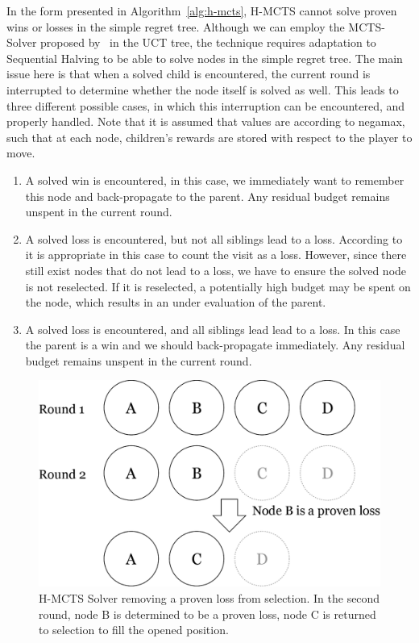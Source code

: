 \documentclass{kecsmstr}
\begin{document}
In the form presented in Algorithm~\ref{alg:h-mcts}, H-MCTS cannot solve proven wins or losses in the simple regret tree. Although we can employ the MCTS-Solver proposed by~ in the UCT tree, the technique requires adaptation to Sequential Halving to be able to solve nodes in the simple regret tree. The main issue here is that when a solved child is encountered, the current round is interrupted to determine whether the node itself is solved as well. This leads to three different possible cases, in which this interruption can be encountered, and properly handled. Note that it is assumed that values are according to negamax, such that at each node, children's rewards are stored with respect to the player to move.
\begin{enumerate}
\item A solved win is encountered, in this case, we immediately want to remember this node and back-propagate to the parent. Any residual budget remains unspent in the current round.
\item A solved loss is encountered, but not all siblings lead to a loss. According to~ it is appropriate in this case to count the visit as a loss. However, since there still exist nodes that do not lead to a loss, we have to ensure the solved node is not reselected. If it is reselected, a potentially high budget may be spent on the node, which results in an under evaluation of the parent.
\item A solved loss is encountered, and all siblings lead lead to a loss. In this case the parent is a win and we should back-propagate immediately. Any residual budget remains unspent in the current round.
\end{enumerate}
\begin{figure}[hb]
	\centering
	\includegraphics[width=.6\textwidth]{img/solver.png}
	\caption{H-MCTS Solver removing a proven loss from selection. In the second round, node B is determined to be a proven loss, node C is returned to selection to fill the opened position.}
	\label{fig:h-mcts_solver}
\end{figure}
\end{document}
